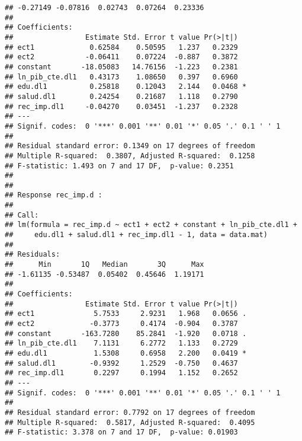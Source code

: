 \documentclass[]{book}
\newenvironment{Shaded}{\begin{snugshade}}{\end{snugshade}}
\newcommand{\KeywordTok}[1]{\textcolor[rgb]{0.13,0.29,0.53}{\textbf{#1}}}
\newcommand{\DecValTok}[1]{\textcolor[rgb]{0.00,0.00,0.81}{#1}}
\newcommand{\StringTok}[1]{\textcolor[rgb]{0.31,0.60,0.02}{#1}}
\newcommand{\OperatorTok}[1]{\textcolor[rgb]{0.81,0.36,0.00}{\textbf{#1}}}
\newcommand{\NormalTok}[1]{#1}
\theoremstyle{definition}
\theoremstyle{definition}
\theoremstyle{definition}
\theoremstyle{remark}
\begin{document}
\begin{verbatim}
## -0.27149 -0.07816  0.02743  0.07264  0.23336 
## 
## Coefficients:
##                 Estimate Std. Error t value Pr(>|t|)  
## ect1             0.62584    0.50595   1.237   0.2329  
## ect2            -0.06411    0.07224  -0.887   0.3872  
## constant       -18.05083   14.76156  -1.223   0.2381  
## ln_pib_cte.dl1   0.43173    1.08650   0.397   0.6960  
## edu.dl1          0.25818    0.12043   2.144   0.0468 *
## salud.dl1        0.24254    0.21687   1.118   0.2790  
## rec_imp.dl1     -0.04270    0.03451  -1.237   0.2328  
## ---
## Signif. codes:  0 '***' 0.001 '**' 0.01 '*' 0.05 '.' 0.1 ' ' 1
## 
## Residual standard error: 0.1349 on 17 degrees of freedom
## Multiple R-squared:  0.3807, Adjusted R-squared:  0.1258 
## F-statistic: 1.493 on 7 and 17 DF,  p-value: 0.2351
## 
## 
## Response rec_imp.d :
## 
## Call:
## lm(formula = rec_imp.d ~ ect1 + ect2 + constant + ln_pib_cte.dl1 + 
##     edu.dl1 + salud.dl1 + rec_imp.dl1 - 1, data = data.mat)
## 
## Residuals:
##      Min       1Q   Median       3Q      Max 
## -1.61135 -0.53487  0.05402  0.45646  1.19171 
## 
## Coefficients:
##                 Estimate Std. Error t value Pr(>|t|)  
## ect1              5.7533     2.9231   1.968   0.0656 .
## ect2             -0.3773     0.4174  -0.904   0.3787  
## constant       -163.7280    85.2841  -1.920   0.0718 .
## ln_pib_cte.dl1    7.1131     6.2772   1.133   0.2729  
## edu.dl1           1.5308     0.6958   2.200   0.0419 *
## salud.dl1        -0.9392     1.2529  -0.750   0.4637  
## rec_imp.dl1       0.2297     0.1994   1.152   0.2652  
## ---
## Signif. codes:  0 '***' 0.001 '**' 0.01 '*' 0.05 '.' 0.1 ' ' 1
## 
## Residual standard error: 0.7792 on 17 degrees of freedom
## Multiple R-squared:  0.5817, Adjusted R-squared:  0.4095 
## F-statistic: 3.378 on 7 and 17 DF,  p-value: 0.01903
\end{verbatim}

\begin{Shaded}
\end{Shaded}
\end{document}
